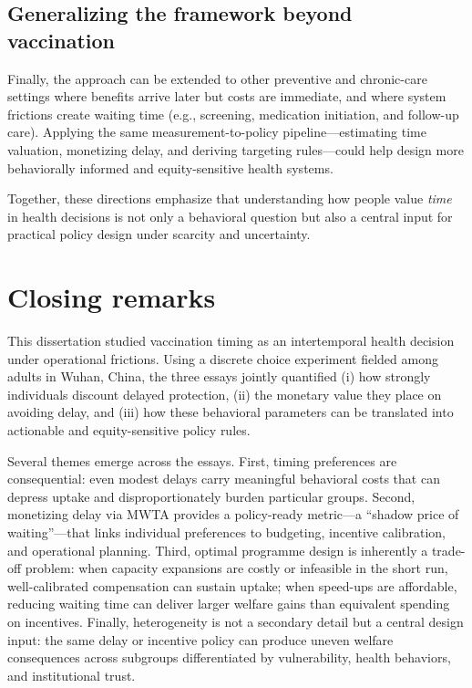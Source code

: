 \documentclass[doublespacing]{utdthesis}
\begin{document}
\subsection{Generalizing the framework beyond vaccination}
Finally, the approach can be extended to other preventive and chronic-care settings where benefits arrive later but costs are immediate, and where system frictions create waiting time (e.g., screening, medication initiation, and follow-up care). Applying the same measurement-to-policy pipeline—estimating time valuation, monetizing delay, and deriving targeting rules—could help design more behaviorally informed and equity-sensitive health systems.

Together, these directions emphasize that understanding how people value \emph{time} in health decisions is not only a behavioral question but also a central input for practical policy design under scarcity and uncertainty.

\section{Closing remarks}
\label{sec:closing_remarks}

This dissertation studied vaccination timing as an intertemporal health decision under operational frictions. Using a discrete choice experiment fielded among adults in Wuhan, China, the three essays jointly quantified (i) how strongly individuals discount delayed protection, (ii) the monetary value they place on avoiding delay, and (iii) how these behavioral parameters can be translated into actionable and equity-sensitive policy rules.

Several themes emerge across the essays. First, timing preferences are consequential: even modest delays carry meaningful behavioral costs that can depress uptake and disproportionately burden particular groups. Second, monetizing delay via MWTA provides a policy-ready metric---a ``shadow price of waiting''---that links individual preferences to budgeting, incentive calibration, and operational planning. Third, optimal programme design is inherently a trade-off problem: when capacity expansions are costly or infeasible in the short run, well-calibrated compensation can sustain uptake; when speed-ups are affordable, reducing waiting time can deliver larger welfare gains than equivalent spending on incentives. Finally, heterogeneity is not a secondary detail but a central design input: the same delay or incentive policy can produce uneven welfare consequences across subgroups differentiated by vulnerability, health behaviors, and institutional trust.
\end{document}
